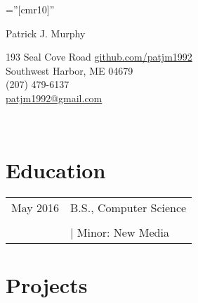 \documentclass[a4paper,10pt]{article}
\begin{document}
%

\pagestyle{empty} %

\font\fb=''[cmr10]'' %



\par{
		{\Huge Patrick J. Murphy
	}\bigskip\par}
	\bigskip




   
      193 Seal Cove Road \qquad \qquad \qquad \qquad \qquad \href{https://github.com/patjm1992}{github.com/patjm1992}  \\
      Southwest Harbor, ME 04679 \\
   (207) 479-6137 \\
 \href{mailto:patjm1992@gmail.com}{patjm1992@gmail.com}

\\
\vspace*{0.5cm}
\section{Education}
\begin{tabular}{rl}	
\footnotesize{May 2016} & {\setmainfont{HoeflerText Bold.otf}B.S., Computer Science} \\ & {\setmainfont{HoeflerText Italic.otf}{University of Maine at Orono}} \\
&  \small\emph{\setmainfont{smallcaps.otf}{cum laude}} | Minor: New Media\\

\end{tabular}

\vspace*{0.5cm}
\section{Projects}
\end{document}
